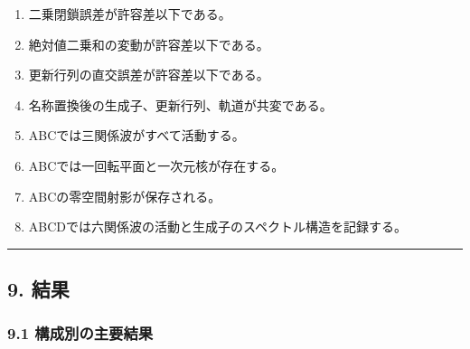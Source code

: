 \documentclass[
  10pt,
  a4paper,
]{article}
\providecommand{\tightlist}{%
  \setlength{\itemsep}{0pt}\setlength{\parskip}{0pt}}
\begin{document}
\begin{enumerate}
\def\labelenumi{\arabic{enumi}.}
\tightlist
\item
  二乗閉鎖誤差が許容差以下である。
\item
  絶対値二乗和の変動が許容差以下である。
\item
  更新行列の直交誤差が許容差以下である。
\item
  名称置換後の生成子、更新行列、軌道が共変である。
\item
  ABCでは三関係波がすべて活動する。
\item
  ABCでは一回転平面と一次元核が存在する。
\item
  ABCの零空間射影が保存される。
\item
  ABCDでは六関係波の活動と生成子のスペクトル構造を記録する。
\end{enumerate}

\begin{center}\rule{0.5\linewidth}{0.5pt}\end{center}

\subsection{9. 結果}\label{ux7d50ux679c}

\subsubsection{9.1
構成別の主要結果}\label{ux69cbux6210ux5225ux306eux4e3bux8981ux7d50ux679c}
\end{document}
